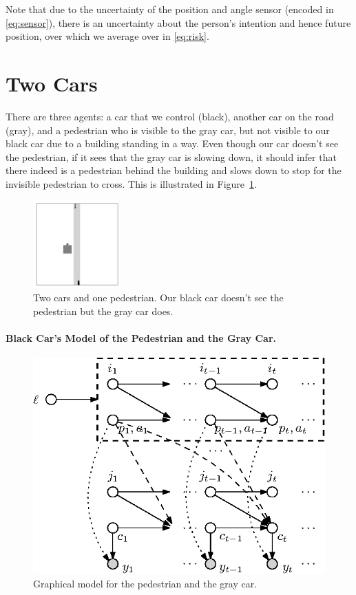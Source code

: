 \documentclass[a4paper]{article}
\begin{document}
Note that due to the uncertainty of the position and angle sensor (encoded in \eqref{eq:sensor}), there is an uncertainty about the person's intention and hence future position, over which we average over in \eqref{eq:risk}.

\section{Two Cars}
There are three agents: a car that we control (black), another car on the road (gray), and a pedestrian who is visible to the gray car, but not visible to our black car due to a building standing in a way.
Even though our car doesn't see the pedestrian, if it sees that the gray car is slowing down, it should infer that there indeed is a pedestrian behind the building and slows down to stop for the invisible pedestrian to cross.
This is illustrated in Figure~\ref{fig:talking_pedestrians_6}.
\begin{figure}[htb]
    \centering
    \includegraphics[width=0.3\textwidth]{figures/talking_pedestrians_6.png}
    \caption{Two cars and one pedestrian. Our black car doesn't see the pedestrian but the gray car does.}
    \label{fig:talking_pedestrians_6}
\end{figure}

\paragraph{Black Car's Model of the Pedestrian and the Gray Car.}
\begin{figure}[htb]
    \centering
    \includegraphics{figures/talking_pedestrians_5}
    \caption{Graphical model for the pedestrian and the gray car.}
    \label{fig:talking_pedestrians_5}
\end{figure}
\end{document}
